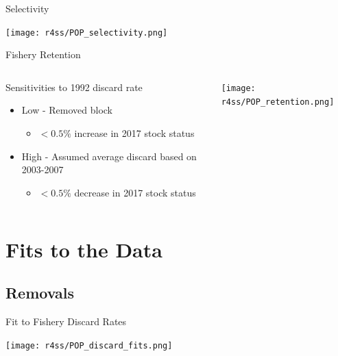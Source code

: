 \documentclass[pdf]{beamer}\usepackage[]{graphicx}\usepackage[]{color}
\begin{document}
\begin{frame}{Selectivity}
  \begin{center}
    \texttt{[image: r4ss/POP\_selectivity.png]}
  \end{center}
\end{frame}

\begin{frame}{Fishery Retention}
\begin{columns}
  \begin{column}{0.4\textwidth}
      Sensitivities to 1992 discard rate
      \begin{itemize}
        \item Low - Removed block  
          \begin{itemize}
            \item $< 0.5\%$ increase in 2017 stock status
          \end{itemize}
        \item High - Assumed average discard based on 2003-2007 
          \begin{itemize}
            \item $< 0.5\%$ decrease in 2017 stock status
          \end{itemize}
      \end{itemize}
  \end{column}
  
  \begin{column}{0.6\textwidth}
  \begin{center}
    \texttt{[image: r4ss/POP\_retention.png]}
  \end{center}
  \end{column}
\end{columns}
\end{frame}



\section{Fits to the Data}
\subsection{Removals}
\begin{frame}{Fit to Fishery Discard Rates}
  \begin{center}
    \texttt{[image: r4ss/POP\_discard\_fits.png]}
  \end{center}
\end{frame}
\end{document}

